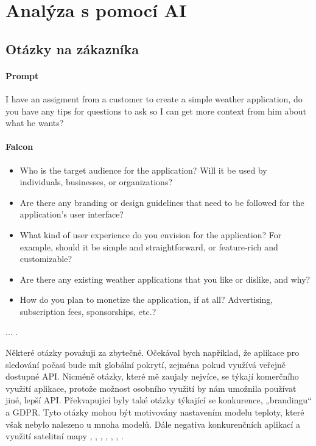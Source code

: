 \documentclass[FM,DP]{tulthesis}
\begin{document}
		\section{Analýza s pomocí AI} 
		\subsection{Otázky na zákazníka}
		\vspace{0.6em}
		\begin{tcolorbox}[colback=white,colframe=black]
			\paragraph{Prompt} I have an assigment from a customer to create a simple weather application, do you have any tips for questions to ask so I can get more context from him about what he wants?
			
			\vspace{0.6em}
			
			\paragraph{Falcon} 
			\begin{itemize}
				\item Who is the target audience for the application? Will it be used by individuals, businesses, or organizations?
				\item Are there any branding or design guidelines that need to be followed for the application's user interface?
				\item What kind of user experience do you envision for the application? For example, should it be simple and straightforward, or feature-rich and customizable?
				\item Are there any existing weather applications that you like or dislike, and why?
				\item How do you plan to monetize the application, if at all? Advertising, subscription fees, sponsorships, etc.? 
			\end{itemize}
			... \cite{falcon_analyza}.
		\end{tcolorbox}
		
		
		Některé otázky považuji za zbytečné. Očekával bych například, že aplikace pro sledování počasí bude mít globální pokrytí, zejména pokud využívá veřejně dostupné API. Nicméně otázky, které mě zaujaly nejvíce, se týkají komerčního využití aplikace, protože možnost osobního využití by nám umožnila používat jiné, lepší API. Překvapující byly také otázky týkající se konkurence, „brandingu“ a GDPR. Tyto otázky mohou být motivovány nastavením modelu teploty, které však nebylo nalezeno u mnoha modelů. Dále negativa konkurenčních aplikací a využití satelitní mapy \cite{codellama_analyza}, \cite{chatgpt_analyza}, \cite{bingCopilot_analyza}, \cite{gitCopilot_analyza}, \cite{bard_analyza}, \cite{claude_analyza}, \cite{falcon_analyza}.
		
\end{document}
